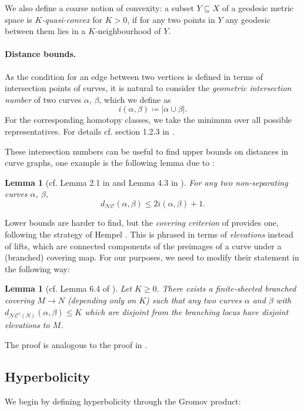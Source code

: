 \documentclass[a4paper]{article}
\newtheorem{lemma}[theorem]{Lemma}
\newcommand{\ncg}{\mathcal{NC}}
\newcommand{\fncg}{\mathcal{NC}^\dagger}
\begin{document}
We also define a coarse notion of convexity:
a subset $Y\subseteq X$ of a geodesic metric space is \emph{$K$-quasi-convex} for $K>0$, if for any two points in $Y$ any geodesic between them lies in a $K$-neighbourhood of $Y$.

\paragraph{Distance bounds.}
As the condition for an edge between two vertices is defined in terms of intersection points of curves, it is natural to consider the \emph{geometric intersection number} of two curves $\alpha$, $\beta$, which we define as
    \[ i(\alpha,\beta) \coloneqq \lvert \alpha \cup \beta\rvert.\]
For the corresponding homotopy classes, we take the minimum over all possible representatives.
For details cf. section 1.2.3 in \cite{primer}.

These intersection numbers can be useful to find upper bounds on distances in curve graphs, one example is the following lemma due to \cite{masur-minsky}:
\begin{lemma}[cf. Lemma 2.1 in \cite{masur-minsky} and Lemma 4.3 in \cite{kuno-hyperbolicity}]\label{lem:upper-bound-intersection-no}
    For any two non-separating curves $\alpha$, $\beta$,
    \[d_{\ncg}(\alpha,\beta) \leq 2i(\alpha,\beta) +1 .\]
\end{lemma}

Lower bounds are harder to find, but the \emph{covering criterion} of \cite{BHMMW} provides one, following the strategy of Hempel \cite{hempel}.
This is phrased in terms of \emph{elevations} instead of lifts, which are connected components of the preimages of a curve under a (branched) covering map.
For our purposes, we need to modify their statement in the following way:

\begin{lemma}[cf. Lemma 6.4 of \cite{BHMMW}]\label{lem:covering-criterion}
    Let $K\geq 0$.
    There exists a finite-sheeted branched covering $M \rightarrow N$ (depending only on $K$) such that any two curves $\alpha$ and $\beta$ with $d_{\fncg(N)}(\alpha,\beta)\leq K$ which are disjoint from the branching locus have disjoint elevations to $M$.
\end{lemma}

The proof is analogous to the proof in \cite{BHMMW}.

\subsection{Hyperbolicity}
We begin by defining hyperbolicity through the Gromov product:
\end{document}
